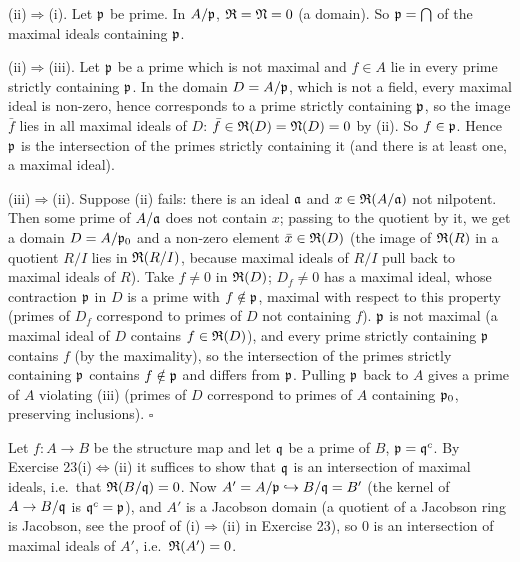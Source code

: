 \documentclass[11pt]{article}
\begin{document}
(ii)$\Rightarrow$(i). Let $\mathfrak p$ be prime. In $A/\mathfrak p$, $\mathfrak R=\mathfrak N=0$ (a domain). So $\mathfrak p=\bigcap$ of the maximal ideals containing $\mathfrak p$.

(ii)$\Rightarrow$(iii). Let $\mathfrak p$ be a prime which is not maximal and $f\in A$ lie in every prime strictly containing $\mathfrak p$. In the domain $D=A/\mathfrak p$, which is not a field, every maximal ideal is non-zero, hence corresponds to a prime strictly containing $\mathfrak p$, so the image $\bar f$ lies in all maximal ideals of $D$: $\bar f\in\mathfrak R(D)=\mathfrak N(D)=0$ by (ii). So $f\in\mathfrak p$. Hence $\mathfrak p$ is the intersection of the primes strictly containing it (and there is at least one, a maximal ideal).

(iii)$\Rightarrow$(ii). Suppose (ii) fails: there is an ideal $\mathfrak a$ and $x\in\mathfrak R(A/\mathfrak a)$ not nilpotent. Then some prime of $A/\mathfrak a$ does not contain $x$; passing to the quotient by it, we get a domain $D=A/\mathfrak p_0$ and a non-zero element $\bar x\in\mathfrak R(D)$ (the image of $\mathfrak R(R)$ in a quotient $R/I$ lies in $\mathfrak R(R/I)$, because maximal ideals of $R/I$ pull back to maximal ideals of $R$). Take $f\ne0$ in $\mathfrak R(D)$; $D_f\ne0$ has a maximal ideal, whose contraction $\mathfrak p$ in $D$ is a prime with $f\notin\mathfrak p$, maximal with respect to this property (primes of $D_f$ correspond to primes of $D$ not containing $f$). $\mathfrak p$ is not maximal (a maximal ideal of $D$ contains $f\in\mathfrak R(D)$), and every prime strictly containing $\mathfrak p$ contains $f$ (by the maximality), so the intersection of the primes strictly containing $\mathfrak p$ contains $f\notin\mathfrak p$ and differs from $\mathfrak p$. Pulling $\mathfrak p$ back to $A$ gives a prime of $A$ violating (iii) (primes of $D$ correspond to primes of $A$ containing $\mathfrak p_0$, preserving inclusions). \hfill$\square$

\pf
Let $f:A\to B$ be the structure map and let $\mathfrak q$ be a prime of $B$, $\mathfrak p=\mathfrak q^c$. By Exercise 23(i)$\Leftrightarrow$(ii) it suffices to show that $\mathfrak q$ is an intersection of maximal ideals, i.e.\ that $\mathfrak R(B/\mathfrak q)=0$. Now $A'=A/\mathfrak p\hookrightarrow B/\mathfrak q=B'$ (the kernel of $A\to B/\mathfrak q$ is $\mathfrak q^c=\mathfrak p$), and $A'$ is a Jacobson domain (a quotient of a Jacobson ring is Jacobson, see the proof of (i)$\Rightarrow$(ii) in Exercise 23), so $0$ is an intersection of maximal ideals of $A'$, i.e.\ $\mathfrak R(A')=0$.
\end{document}

